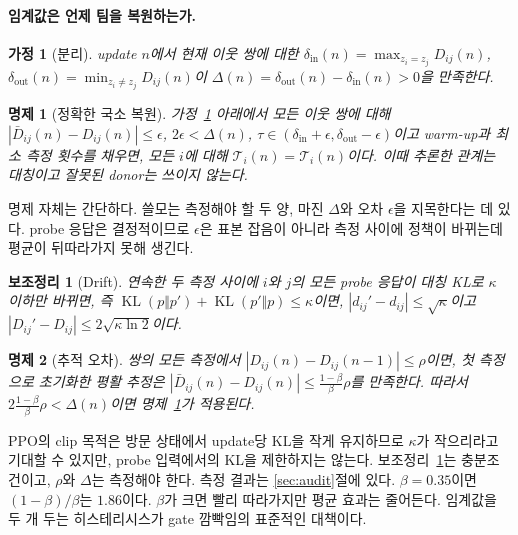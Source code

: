 \documentclass[twocolumn,10pt]{article}
\newtheorem{proposition}{명제}
\newtheorem{lemma}{보조정리}
\newtheorem{assumption}{가정}
\theoremstyle{remark}
\newcommand{\KL}{\operatorname{KL}}
\begin{document}
\paragraph{임계값은 언제 팀을 복원하는가.}
\begin{assumption}[분리]
\label{as:separation}
update $n$에서 현재 이웃 쌍에 대한 $\delta_{\mathrm{in}}(n)=\max_{z_i=z_j}D_{ij}(n)$, $\delta_{\mathrm{out}}(n)=\min_{z_i\ne z_j}D_{ij}(n)$이
$\Delta(n)=\delta_{\mathrm{out}}(n)-\delta_{\mathrm{in}}(n)>0$을 만족한다.
\end{assumption}
\begin{proposition}[정확한 국소 복원]
\label{prop:recovery}
가정~\ref{as:separation} 아래에서 모든 이웃 쌍에 대해 $|\bar D_{ij}(n)-D_{ij}(n)|\le\epsilon$, $2\epsilon<\Delta(n)$,
$\tau\in(\delta_{\mathrm{in}}+\epsilon,\delta_{\mathrm{out}}-\epsilon)$이고 warm-up과 최소 측정 횟수를 채우면, 모든 $i$에 대해
$\hat{\mathcal{T}}_i(n)=\mathcal{T}_i(n)$이다. 이때 추론한 관계는 대칭이고 잘못된 donor는 쓰이지 않는다.
\end{proposition}
명제 자체는 간단하다. 쓸모는 측정해야 할 두 양, 마진 $\Delta$와 오차 $\epsilon$을 지목한다는 데 있다. probe 응답은 결정적이므로
$\epsilon$은 표본 잡음이 아니라 측정 사이에 정책이 바뀌는데 평균이 뒤따라가지 못해 생긴다.
\begin{lemma}[Drift]
\label{lem:drift}
연속한 두 측정 사이에 $i$와 $j$의 모든 probe 응답이 대칭 KL로 $\kappa$ 이하만 바뀌면, 즉 $\KL(p\Vert p')+\KL(p'\Vert p)\le\kappa$이면,
$|d_{ij}'-d_{ij}|\le\sqrt{\kappa}$이고 $|D_{ij}'-D_{ij}|\le2\sqrt{\kappa\ln 2}$이다.
\end{lemma}
\begin{proposition}[추적 오차]
\label{prop:tracking}
쌍의 모든 측정에서 $|D_{ij}(n)-D_{ij}(n-1)|\le\rho$이면, 첫 측정으로 초기화한 평활 추정은
$|\bar D_{ij}(n)-D_{ij}(n)|\le\frac{1-\beta}{\beta}\rho$를 만족한다. 따라서 $2\frac{1-\beta}{\beta}\rho<\Delta(n)$이면
명제~\ref{prop:recovery}가 적용된다.
\end{proposition}
PPO의 clip 목적은 방문 상태에서 update당 KL을 작게 유지하므로 $\kappa$가 작으리라고 기대할 수 있지만, probe 입력에서의 KL을
제한하지는 않는다. 보조정리~\ref{lem:drift}는 충분조건이고, $\rho$와 $\Delta$는 측정해야 한다. 측정 결과는 \ref{sec:audit}절에
있다. $\beta=0.35$이면 $(1-\beta)/\beta$는 $1.86$이다. $\beta$가 크면 빨리 따라가지만 평균 효과는 줄어든다. 임계값을 두 개 두는
히스테리시스가 gate 깜빡임의 표준적인 대책이다.
\end{document}
